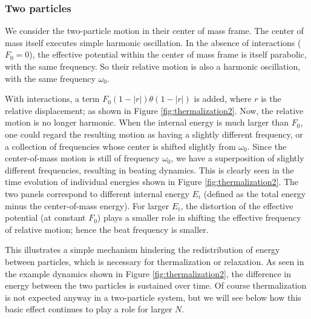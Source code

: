 \documentclass[a4paper, onecolumn]{revtex4-1}
\begin{document}
\subsubsection{Two particles}

We consider the two-particle motion in their center of mass frame.  The center of mass itself
executes simple harmonic oscillation.  In the absence of interactions ($F_0=0$), the effective
potential within the center of mass frame is itself parabolic, with the same frequency.  So their
relative motion is also a harmonic oscillation, with the same frequency $\omega_0$.

With interactions, a term $F_0(1-|r|)\theta(1-|r|)$ is added, where $r$ is the relative
displacement; as shown in Figure \ref{fig:thermalization2}.  Now, the relative motion is no longer
harmonic.  When the internal energy is much larger than $F_0$, one could regard the resulting motion
as having a slightly different frequency, or a collection of frequencies whose center is shifted
slightly from $\omega_0$.  Since the center-of-mass motion is still of frequency $\omega_0$, we have
a superposition of slightly different frequencies, resulting in beating dynamics.  This is clearly
seen in the time evolution of individual energies shown in Figure \ref{fig:thermalization2}.  The
two panels correspond to different internal energy $E_i$ (defined as the total energy minus the
center-of-mass energy).  For larger $E_i$, the distortion of the effective potential (at constant
$F_0$) plays a smaller role in shifting the effective frequency of relative motion; hence the beat
frequency is smaller.

This illustrates a simple mechanism hindering the redistribution of energy between particles, which
is necessary for thermalization or relaxation.  As seen in the example dynamics shown in Figure
\ref{fig:thermalization2}, the difference in energy between the two particles is sustained over
time.  Of course thermalization is not expected anyway in a two-particle system, but we will see
below how this basic effect continues to play a role for larger $N$.
\end{document}
